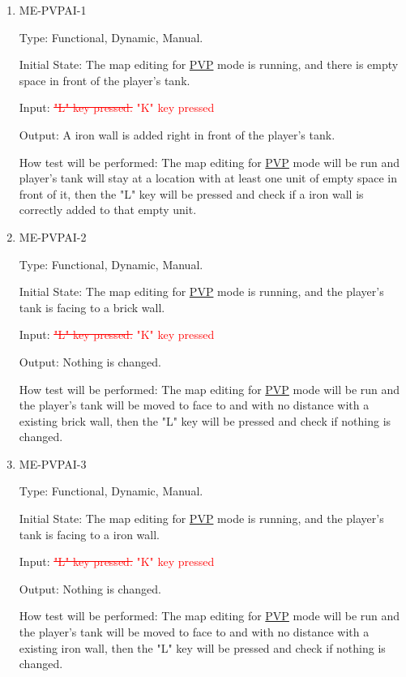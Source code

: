\documentclass[12pt, titlepage]{article}
\begin{document}
\begin{enumerate}

\item{ME-PVPAI-1\\}

Type: Functional, Dynamic, Manual.
					
Initial State: The map editing for \underline{PVP} mode is running, and there is empty space in front of the player's tank.
					
Input: \textcolor{red}{\sout{"L" key pressed.}} \textcolor{red}{"K" key pressed}
					
Output: A iron wall is added right in front of the player's tank.
					
How test will be performed: The map editing for \underline{PVP} mode will be run and player's tank will stay at a location with at least one unit of empty space in front of it, then the "L" key will be pressed and check if a iron wall is correctly added to that empty unit.

\item{ME-PVPAI-2\\}

Type: Functional, Dynamic, Manual.
					
Initial State: The map editing for \underline{PVP} mode is running, and the player's tank is facing to a brick wall.
					
Input: \textcolor{red}{\sout{"L" key pressed.}} \textcolor{red}{"K" key pressed}
					
Output: Nothing is changed.
					
How test will be performed: The map editing for \underline{PVP} mode will be run and the player's tank will be moved to face to and with no distance with a existing brick wall, then the "L" key will be pressed and check if nothing is changed.

\item{ME-PVPAI-3\\}

Type: Functional, Dynamic, Manual.
					
Initial State: The map editing for \underline{PVP} mode is running, and the player's tank is facing to a iron wall.
					
Input: \textcolor{red}{\sout{"L" key pressed.}} \textcolor{red}{"K" key pressed}
					
Output: Nothing is changed.
					
How test will be performed: The map editing for \underline{PVP} mode will be run and the player's tank will be moved to face to and with no distance with a existing iron wall, then the "L" key will be pressed and check if nothing is changed.


\end{enumerate}
\end{document}
